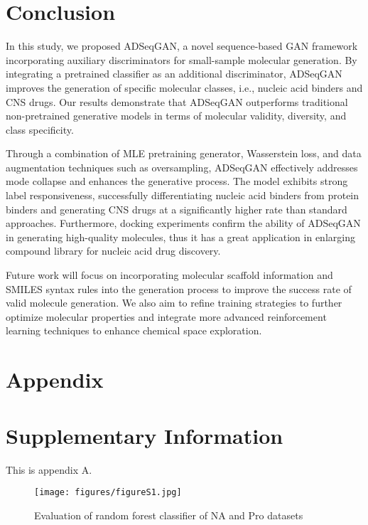 \documentclass[10pt, twocolumn]{article}
\begin{document}
\section{Conclusion}
In this study, we proposed ADSeqGAN, a novel sequence-based GAN framework incorporating auxiliary discriminators for small-sample molecular generation. By integrating a pretrained classifier as an additional discriminator, ADSeqGAN improves the generation of specific molecular classes, i.e., nucleic acid binders and CNS drugs. Our results demonstrate that ADSeqGAN outperforms traditional non-pretrained generative models in terms of molecular validity, diversity, and class specificity.

Through a combination of MLE pretraining generator, Wasserstein loss, and data augmentation techniques such as oversampling, ADSeqGAN effectively addresses mode collapse and enhances the generative process. The model exhibits strong label responsiveness, successfully differentiating nucleic acid binders from protein binders and generating CNS drugs at a significantly higher rate than standard approaches. Furthermore, docking experiments confirm the ability of ADSeqGAN in generating high-quality molecules, thus it has a great application in enlarging compound library for nucleic acid drug discovery.

Future work will focus on incorporating molecular scaffold information and SMILES syntax rules into the generation process to improve the success rate of valid molecule generation. We also aim to refine training strategies to further optimize molecular properties and integrate more advanced reinforcement learning techniques to enhance chemical space exploration.

\let\thefootnote\relax{}

%

\appendix
\clearpage %
\onecolumn  %

\section*{Appendix}  

\section{Supplementary Information}
This is appendix A.
\begin{figure*}[htbp]
    \centering
    \texttt{[image: figures/figureS1.jpg]}
    \renewcommand{\thefigure}{S1}  %
    \caption{Evaluation of random forest classifier of NA and Pro datasets}
    \label{figS1:figS1}
    \renewcommand{\thefigure}{\arabic{figure}}  %
\end{figure*}
\end{document}
